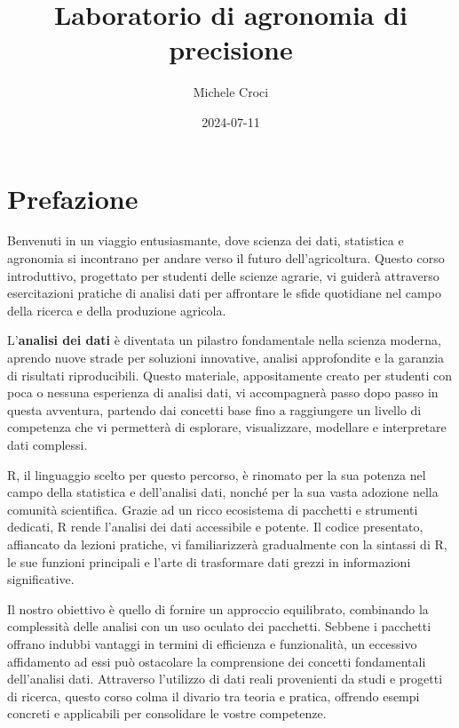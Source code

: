 \documentclass[
]{book}
\title{Laboratorio di agronomia di precisione}
\author{Michele Croci}
\date{2024-07-11}
\theoremstyle{definition}
\theoremstyle{definition}
\theoremstyle{definition}
\theoremstyle{definition}
\theoremstyle{remark}
\begin{document}
\maketitle

{
\setcounter{tocdepth}{1}
\tableofcontents
}
\hypertarget{prefazione}{%
\chapter{Prefazione}\label{prefazione}}

Benvenuti in un viaggio entusiasmante, dove scienza dei dati, statistica e agronomia si incontrano per andare verso il futuro dell'agricoltura. Questo corso introduttivo, progettato per studenti delle scienze agrarie, vi guiderà attraverso esercitazioni pratiche di analisi dati per affrontare le sfide quotidiane nel campo della ricerca e della produzione agricola.

L'\textbf{analisi dei dati} è diventata un pilastro fondamentale nella scienza moderna, aprendo nuove strade per soluzioni innovative, analisi approfondite e la garanzia di risultati riproducibili. Questo materiale, appositamente creato per studenti con poca o nessuna esperienza di analisi dati, vi accompagnerà passo dopo passo in questa avventura, partendo dai concetti base fino a raggiungere un livello di competenza che vi permetterà di esplorare, visualizzare, modellare e interpretare dati complessi.

R, il linguaggio scelto per questo percorso, è rinomato per la sua potenza nel campo della statistica e dell'analisi dati, nonché per la sua vasta adozione nella comunità scientifica. Grazie ad un ricco ecosistema di pacchetti e strumenti dedicati, R rende l'analisi dei dati accessibile e potente. Il codice presentato, affiancato da lezioni pratiche, vi familiarizzerà gradualmente con la sintassi di R, le sue funzioni principali e l'arte di trasformare dati grezzi in informazioni significative.

Il nostro obiettivo è quello di fornire un approccio equilibrato, combinando la complessità delle analisi con un uso oculato dei pacchetti. Sebbene i pacchetti offrano indubbi vantaggi in termini di efficienza e funzionalità, un eccessivo affidamento ad essi può ostacolare la comprensione dei concetti fondamentali dell'analisi dati. Attraverso l'utilizzo di dati reali provenienti da studi e progetti di ricerca, questo corso colma il divario tra teoria e pratica, offrendo esempi concreti e applicabili per consolidare le vostre competenze.
\end{document}
